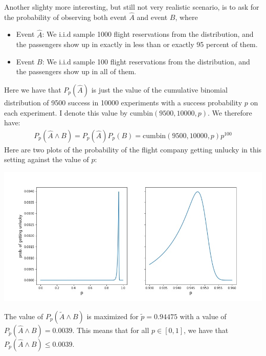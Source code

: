 Another slighty more interesting, but still not very realistic scenario, is to ask for the probability of observing both event $\hat{A}$ and event $B$, where
\begin{itemize}
\item Event $\hat{A}$: We i.i.d sample 1000 flight reservations from the distribution, and the passengers show up in exactly in less than or exactly 95 percent of them.
\item Event $B$: We i.i.d sample 100 flight reservations from the distribution, and the passengers show up in all of them.
\end{itemize}
Here we have that $P_p(\hat{A})$ is just the value of the cumulative binomial distribution of 9500 success in 10000 experiments with a success probability $p$ on each experiment. I denote this value by $\text{cumbin}(9500, 10000,p)$. We therefore have:
\begin{align}
P_p(\hat{A} \land B) = P_p(\hat{A})P_p(B) = \text{cumbin}(9500, 10000,p) p^{100}
\end{align}
Here are two plots of the probability of the flight company getting unlucky in this setting against the value of $p$:
\begin{center}
\includegraphics[scale=0.5]{probability_in_practice/fig2.jpg}
\end{center}
The value of $P_p(\tilde{A} \land B)$ is maximized for $\tilde{p}=0.94475$ with a value of $P_{\tilde{p}}(\hat{A} \land B)=0.0039$. This means that for all $p \in [0,1]$, we have that $P_p(\hat{A} \land B) \leq 0.0039$.
